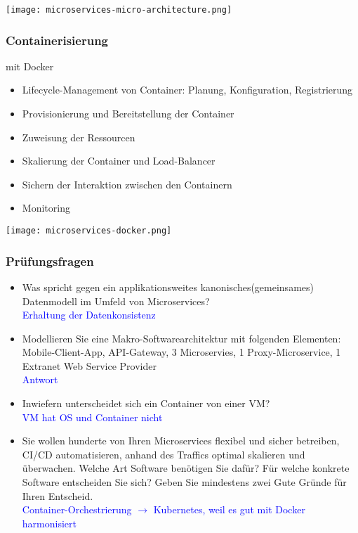 \texttt{[image: microservices-micro-architecture.png]}

\subsubsection{Containerisierung}

mit Docker

\begin{itemize}
    \item Lifecycle-Management von Container: Planung, Konfiguration, Registrierung
    \item Provisionierung und Bereitstellung der Container
    \item Zuweisung der Ressourcen
    \item Skalierung der Container und Load-Balancer
    \item Sichern der Interaktion zwischen den Containern
    \item Monitoring
\end{itemize}

\texttt{[image: microservices-docker.png]}

\columnbreak
\subsubsection{Prüfungsfragen}

\begin{itemize}
    \item Was spricht gegen ein applikationsweites kanonisches(gemeinsames) Datenmodell im Umfeld von Microservices? \\
    \textcolor{blue}{Erhaltung der Datenkonsistenz}
    \item Modellieren Sie eine Makro-Softwarearchitektur mit folgenden Elementen: Mobile-Client-App, API-Gateway, 3 Microservies, 1 Proxy-Microservice, 1 Extranet Web Service Provider \\
    \textcolor{blue}{Antwort}
    \item Inwiefern unterscheidet sich ein Container von einer VM? \\
    \textcolor{blue}{VM hat OS und Container nicht}
    \item Sie wollen hunderte von Ihren Microservices flexibel und sicher betreiben, CI/CD automatisieren, anhand des Traffics optimal skalieren und überwachen. Welche Art Software benötigen Sie dafür? Für welche konkrete Software entscheiden Sie sich? Geben Sie mindestens zwei Gute Gründe für Ihren Entscheid. \\
    \textcolor{blue}{Container-Orchestrierung $\rightarrow$ Kubernetes, weil es gut mit Docker harmonisiert}
\end{itemize}


